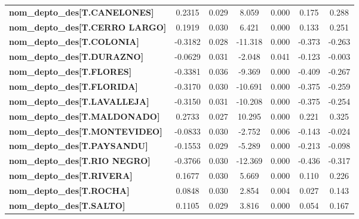 \begin{center}
\begin{tabular}{lcccccc}
\textbf{nom\_depto\_des[T.CANELONES]}       &       0.2315  &        0.029     &     8.059  &         0.000        &        0.175    &        0.288     \\
\textbf{nom\_depto\_des[T.CERRO LARGO]}     &       0.1919  &        0.030     &     6.421  &         0.000        &        0.133    &        0.251     \\
\textbf{nom\_depto\_des[T.COLONIA]}         &      -0.3182  &        0.028     &   -11.318  &         0.000        &       -0.373    &       -0.263     \\
\textbf{nom\_depto\_des[T.DURAZNO]}         &      -0.0629  &        0.031     &    -2.048  &         0.041        &       -0.123    &       -0.003     \\
\textbf{nom\_depto\_des[T.FLORES]}          &      -0.3381  &        0.036     &    -9.369  &         0.000        &       -0.409    &       -0.267     \\
\textbf{nom\_depto\_des[T.FLORIDA]}         &      -0.3170  &        0.030     &   -10.691  &         0.000        &       -0.375    &       -0.259     \\
\textbf{nom\_depto\_des[T.LAVALLEJA]}       &      -0.3150  &        0.031     &   -10.208  &         0.000        &       -0.375    &       -0.254     \\
\textbf{nom\_depto\_des[T.MALDONADO]}       &       0.2733  &        0.027     &    10.295  &         0.000        &        0.221    &        0.325     \\
\textbf{nom\_depto\_des[T.MONTEVIDEO]}      &      -0.0833  &        0.030     &    -2.752  &         0.006        &       -0.143    &       -0.024     \\
\textbf{nom\_depto\_des[T.PAYSANDU]}        &      -0.1553  &        0.029     &    -5.289  &         0.000        &       -0.213    &       -0.098     \\
\textbf{nom\_depto\_des[T.RIO NEGRO]}       &      -0.3766  &        0.030     &   -12.369  &         0.000        &       -0.436    &       -0.317     \\
\textbf{nom\_depto\_des[T.RIVERA]}          &       0.1677  &        0.030     &     5.669  &         0.000        &        0.110    &        0.226     \\
\textbf{nom\_depto\_des[T.ROCHA]}           &       0.0848  &        0.030     &     2.854  &         0.004        &        0.027    &        0.143     \\
\textbf{nom\_depto\_des[T.SALTO]}           &       0.1105  &        0.029     &     3.816  &         0.000        &        0.054    &        0.167     \\

\end{tabular}
\end{center}
